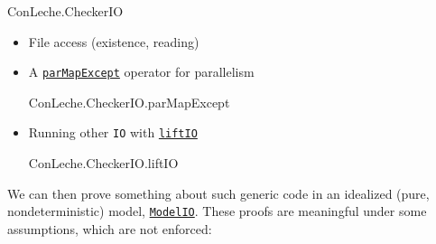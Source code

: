\documentclass{article}
\newcommand\code[1]{\texttt{#1}}
\begin{document}
\begin{leanblock}[view=lean, sum=j6URszxujI]{ConLeche.CheckerIO}{}
\end{leanblock}

\begin{itemize}
\item File access (existence, reading)
\item A \href{https://github.com/leanprover/con-leche/blob/master/ConLeche/Frontend/CheckerIO.lean#L142}{\code{parMapExcept}} operator for parallelism

\begin{leanblock}[view=lean, sum=t8J_xaEFUQ]{ConLeche.CheckerIO.parMapExcept}{}
\end{leanblock}

\item Running other \code{IO} with \href{https://github.com/leanprover/con-leche/blob/master/ConLeche/Frontend/CheckerIO.lean#L150}{\code{liftIO}}

\begin{leanblock}[view=lean, sum=vQo8WPlkTq]{ConLeche.CheckerIO.liftIO}{}
\end{leanblock}

\end{itemize}

We can then prove something about such generic code in an idealized (pure, nondeterministic) model, \href{https://github.com/leanprover/con-leche/blob/master/ConLeche/Frontend/CheckerIO.lean#L262}{\code{ModelIO}}. These proofs are meaningful under some assumptions, which are not enforced:
\end{document}
